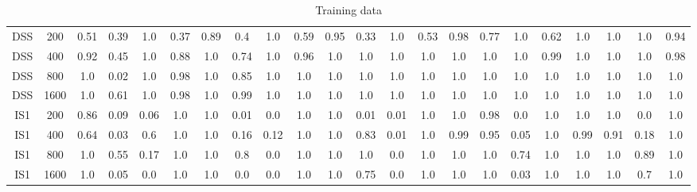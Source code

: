 \documentclass[10pt]{article}
\begin{document}
\begin{table}
\begin{tabular}{ cc||c c c c | c c c c | c c c c | c c c c| c c c c}
 					DSS & 200 & 0.51 & 0.39 & 1.0 & 0.37 & 0.89 & 0.4 & 1.0 & 0.59& 0.95 & 0.33 & 1.0 & 0.53& 0.98 & 0.77 & 1.0 & 0.62 & 1.0 & 1.0 & 1.0 & 0.94 \\ 
 					DSS & 400 & 0.92 & 0.45 & 1.0 & 0.88 & 1.0 & 0.74 & 1.0 & 0.96& 1.0 & 1.0 & 1.0 & 1.0& 1.0 & 1.0 & 1.0 & 0.99 & 1.0 & 1.0 & 1.0 & 0.98\\ 
 					DSS & 800 & 1.0 & 0.02 & 1.0 & 0.98 & 1.0 & 0.85 & 1.0 & 1.0& 1.0 & 1.0 & 1.0 & 1.0& 1.0 & 1.0 & 1.0 & 1.0 & 1.0 & 1.0 & 1.0 & 1.0\\ 
 					DSS & 1600 & 1.0 & 0.61 & 1.0 & 0.98 & 1.0 & 0.99 & 1.0 & 1.0& 1.0 & 1.0 & 1.0 & 1.0& 1.0 & 1.0 & 1.0 & 1.0 & 1.0 & 1.0 & 1.0 & 1.0\\ \hline
 					IS1 & 200 & 0.86 & 0.09 & 0.06 & 1.0 & 1.0 & 0.01 & 0.0 & 1.0& 1.0 & 0.01 & 0.01 & 1.0& 1.0 & 0.98 & 0.0 & 1.0 & 1.0 & 1.0 & 0.0 & 1.0\\ 
 					IS1 & 400 & 0.64 & 0.03 & 0.6 & 1.0 & 1.0 & 0.16 & 0.12 & 1.0& 1.0 & 0.83 & 0.01 & 1.0& 0.99 & 0.95 & 0.05 & 1.0 & 0.99 & 0.91 & 0.18 & 1.0\\ 
 					IS1 & 800 & 1.0 & 0.55 & 0.17 & 1.0 & 1.0 & 0.8 & 0.0 & 1.0& 1.0 & 1.0 & 0.0 & 1.0& 1.0 & 1.0 & 0.74 & 1.0 & 1.0 & 1.0 & 0.89 & 1.0\\ 
 					IS1 & 1600 & 1.0 & 0.05 & 0.0 & 1.0 & 1.0 & 0.0 & 0.0 & 1.0& 1.0 & 0.75 & 0.0 & 1.0& 1.0 & 1.0 & 0.03 & 1.0 & 1.0 & 1.0 & 0.7 & 1.0\\ \hline
 \hline
  \end{tabular}
  \caption{Training data}
\end{table}
\end{document}
